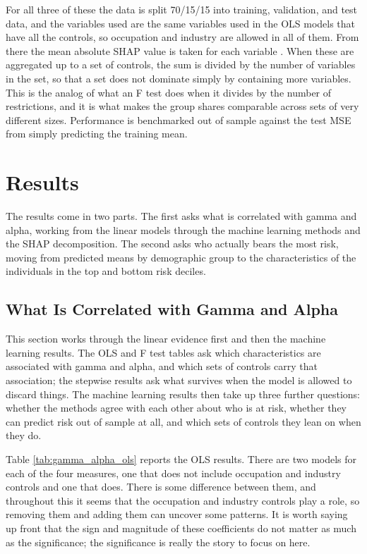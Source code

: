 \documentclass[12pt]{article}
\begin{document}
\begin{onehalfspace}
For all three of these the data is split 70/15/15 into training, validation, and test data, and the variables used are the same variables used in the OLS models that have all the controls, so occupation and industry are allowed in all of them. From there the mean absolute SHAP value is taken for each variable \cite{lundberq}. When these are aggregated up to a set of controls, the sum is divided by the number of variables in the set, so that a set does not dominate simply by containing more variables. This is the analog of what an F test does when it divides by the number of restrictions, and it is what makes the group shares comparable across sets of very different sizes. Performance is benchmarked out of sample against the test MSE from simply predicting the training mean.


\section{Results}

The results come in two parts. The first asks what is correlated with gamma and alpha, working from the linear models through the machine learning methods and the SHAP decomposition. The second asks who actually bears the most risk, moving from predicted means by demographic group to the characteristics of the individuals in the top and bottom risk deciles.

\subsection{What Is Correlated with Gamma and Alpha}

This section works through the linear evidence first and then the machine learning results. The OLS and F test tables ask which characteristics are associated with gamma and alpha, and which sets of controls carry that association; the stepwise results ask what survives when the model is allowed to discard things. The machine learning results then take up three further questions: whether the methods agree with each other about who is at risk, whether they can predict risk out of sample at all, and which sets of controls they lean on when they do.

Table \ref{tab:gamma_alpha_ols} reports the OLS results. There are two models for each of the four measures, one that does not include occupation and industry controls and one that does. There is some difference between them, and throughout this it seems that the occupation and industry controls play a role, so removing them and adding them can uncover some patterns. It is worth saying up front that the sign and magnitude of these coefficients do not matter as much as the significance; the significance is really the story to focus on here.


\end{onehalfspace}
\end{document}
